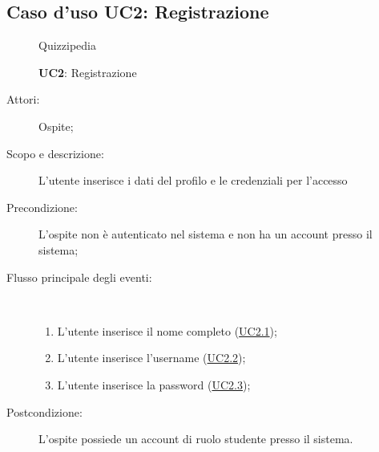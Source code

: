 \subsection{Caso d'uso UC2: Registrazione}
\begin{figure}[H]
	\centering
	\begin{resizedtikzpicture}{\textwidth}
		\begin{umlsystem}[x=0, fill=lightgray!20]{Quizzipedia}
		\end{umlsystem}
	\end{resizedtikzpicture}
	\caption{\textbf{UC2}: Registrazione}
	\label{UC2}
\end{figure}
\begin{description}
	\item[Attori:] Ospite;
	\item[Scopo e descrizione:] L'utente inserisce i dati del profilo e le credenziali per l'accesso
	\item[Precondizione:] L'ospite non è autenticato nel sistema e non ha un account presso il sistema;
	
	\item[Flusso principale degli eventi:] \ 
	\begin{enumerate}
		\item L'utente inserisce il nome completo (\hyperlink{UC2.1}{UC2.1});
		\item L'utente inserisce l'username (\hyperlink{UC2.2}{UC2.2});
		\item L'utente inserisce la password (\hyperlink{UC2.3}{UC2.3});
		
	\end{enumerate}
	\item[Postcondizione:] L’ospite possiede un account di ruolo studente presso il sistema.
\end{description}
\hypertarget{UC2.1}{}
